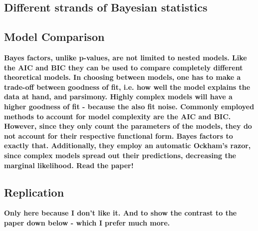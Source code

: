 \documentclass[12pt]{scrartcl}
\begin{document}
\subsection{Different strands of Bayesian statistics}
\begin{description}
  \item {}
  \item {}
\end{description}

\subsection{Model Comparison}
\begin{description}
  \item {}
  
  \textbf{Bayes factors, unlike p-values, are not limited to nested models. Like the AIC and BIC they can be used to compare completely different theoretical models. In choosing between models, one has to make a trade-off between goodness of fit, i.e. how well the model explains the data at hand, and parsimony. Highly complex models will have a higher goodness of fit - because the also fit noise. Commonly employed methods to account for model complexity are the AIC and BIC. However, since they only count the parameters of the models, they do not account for their respective functional form. Bayes factors to exactly that. Additionally, they employ an automatic Ockham's razor, since complex models spread out their predictions, decreasing the marginal likelihood. Read the paper!}
\end{description}

\subsection{Replication}
\begin{description}

  \item {}
  
  \textbf{Only here because I don't like it. And to show the contrast to the paper down below - which I prefer much more.}

  \item {}

\end{description}
\end{document}
